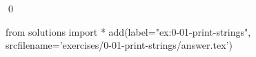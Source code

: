 
\begin{ex}
  \label{ex:0-01-print-strings}
  
  \qed
\end{ex}
\begin{python0}
from solutions import *
add(label="ex:0-01-print-strings",
    srcfilename='exercises/0-01-print-strings/answer.tex')
\end{python0}
